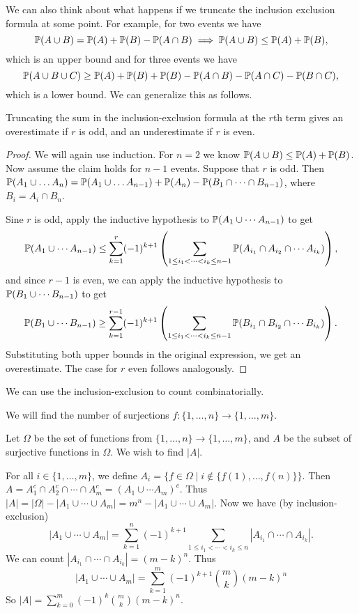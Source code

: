 \documentclass[a4paper]{scrreprt}
\begin{document}
We can also think about what happens if we truncate the inclusion exclusion formula at some point. For example, for two events we have
$$
\mathbb{P}(A \cup B) = \mathbb{P}(A) + \mathbb{P}(B) - \mathbb{P}(A \cap B) \implies \mathbb{P}(A\cup B) \leq \mathbb{P}(A) + \mathbb{P}(B),
$$
which is an upper bound and for three events we have
$$
\mathbb{P}(A \cup B \cup C) \geq \mathbb{P}(A) + \mathbb{P}(B) +  \mathbb{P}(B) - \mathbb{P}(A \cap B) - \mathbb{P}(A \cap C) - \mathbb{P}(B \cap C),
$$
which is a lower bound. We can generalize this as follows.

\begin{proposition}
	Truncating the sum in the inclusion-exclusion formula at the $r$th term gives an overestimate if $r$ is odd, and an underestimate if $r$ is even.
\end{proposition}
\begin{proof}
	We will again use induction. For $n = 2$ we know $\mathbb{P}(A \cup B) \leq \mathbb{P}(A) + \mathbb{P}(B)$. Now assume the claim holds for $n - 1$ events. Suppose that $r$ is odd. Then $\mathbb{P}(A_1 \cup \dots A_n) = \mathbb{P}(A_1 \cup \dots A_{n-1}) + \mathbb{P}(A_n) - \mathbb{P}(B_1 \cap \cdots \cap B_{n - 1})$, where $B_i = A_i \cap B_n$.

	Sine $r$ is odd, apply the inductive hypothesis to $\mathbb{P}(A_1 \cup \cdots A_{n-1})$ to get
	$$
	\mathbb{P}(A_1 \cup \cdots A_{n - 1}) \leq \sum_{k = 1}^{r} (-1)^{k + 1} \left(\sum_{1 \leq i_1 < \cdots < i_k \leq n-1} \mathbb{P}(A_{i_1} \cap A_{i_2} \cap \cdots A_{i_k})\right),
	$$
	and since $r - 1$ is even, we can apply the inductive hypothesis to $\mathbb{P}(B_1 \cup \cdots B_{n - 1})$ to get
	$$
	\mathbb{P}(B_1 \cup \cdots B_{n - 1}) \geq \sum_{k = 1}^{r - 1} (-1)^{k + 1} \left(\sum_{1 \leq i_1 < \cdots < i_k \leq n-1} \mathbb{P}(B_{i_1} \cap B_{i_2} \cap \cdots B_{i_k})\right).
	$$
	Substituting both upper bounds in the original expression, we get an overestimate. The case for $r$ even follows analogously.
\end{proof}

We can use the inclusion-exclusion to count combinatorially.

\begin{example}
	We will find the number of surjections $f: \{1, \dots, n\} \rightarrow \{1, \dots, m\}$.

	Let $\Omega$ be the set of functions from $\{1, \dots, n\} \rightarrow \{1, \dots, m\}$, and $A$ be the subset of surjective functions in $\Omega$. We wish to find $|A|$.

	For all $i \in \{1, \dots, m\}$, we define $A_i = \{f \in \Omega \mid i \not\in \{f(1), \dots, f(n)\}\}$. Then $A = A_1^c \cap A_2^c \cap \cdots \cap A_m^c = (A_1 \cup \cdots A_m)^c$. Thus $|A| = |\Omega| - |A_1 \cup \cdots \cup A_m| = m^n - |A_1 \cup \cdots \cup A_m|$. Now we have (by inclusion-exclusion)
	$$
	|A_1 \cup \cdots \cup A_m| =\sum_{k = 1}^n (-1)^{k + 1} \sum_{1 \leq i_1 < \cdots < i_k \leq n} |A_{i_1} \cap \cdots \cap A_{i_k}|.
	$$
	We can count $|A_{i_1} \cap \cdots \cap A_{i_k}| = (m - k)^n$.
	Thus
	$$
	|A_1 \cup \cdots \cup A_m| = \sum_{k=1}^m (-1)^{k + 1} \binom{m}{k} (m - k)^n
	$$
	So $|A| = \sum_{k = 0}^m (-1)^k \binom{m}{k}(m - k)^n$.
\end{example}
\end{document}
